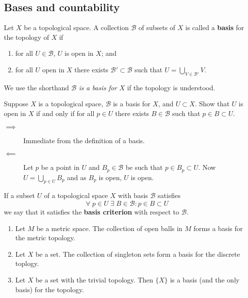 
\subsection{Bases and countability}

\begin{definition}[Basis]
	Let $X$ be a topological space.
	A collection $\mathcal B$ of subsets of $X$ is called a \textbf{basis} 
	for the topology of $X$ if
	\begin{enumerate}
		\item for all $U \in \mathcal B$, $U$ is open in $X$; and
		\item for all $U$ open in $X$ there exists 
			$\mathcal B' \subset \mathcal B$ such that
			$U = \bigcup_{V \in \mathcal B'} V$.
	\end{enumerate}
	We use the shorthand \emph{$\mathcal B$ is a basis for $X$} if the topology
	is understood.
\end{definition}

\begin{problem}
	Suppose $X$ is a topological space, 
	$\mathcal B$ is a basis for $X$, 
	and $U \subset X$.
	Show that $U$ is open in $X$ if and only if
	for all $p \in U$ there exists $B \in \mathcal B$
	such that $p \in B \subset U$.
\end{problem}

\begin{solution}
	\hfill
	\begin{description}
		\item[$\implies$] 
			Immediate from the definition of a basis.

		\item[$\impliedby$]
			Let $p$ be a point in $U$ and $B_p \in \mathcal B$ be such that
			$p \in B_p \subset U$.
			Now $U = \bigcup_{p \in U} B_p$ and as $B_p$ is open,
			$U$ is open.
	\end{description}
\end{solution}

\begin{remark}
	If a subset $U$ of a topological space $X$ with basis $\mathcal B $ satisfies
	\[
		\;\forall\; p \in U \;\exists\; B \in \mathcal B: p \in B \subset U
	\]
	we say that it satisfies the \textbf{basis criterion} with respect to
	$\mathcal B$.
\end{remark}

\begin{example}
	\hfill
	\begin{enumerate}
		\item 
			Let $M$ be a metric space.
			The collection of open balls in $M$ forms a basis for
			the metric topology.

		\item 
			Let $X$ be a set.
			The collection of singleton sets form a basis
			for the discrete toplogy.

		\item 
			Let $X$ be a set with the trivial topology.
			Then $\{X\}$ is a basis (and the only basis) for the topology.
	\end{enumerate}
\end{example}


